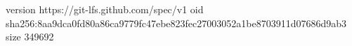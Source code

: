 version https://git-lfs.github.com/spec/v1
oid sha256:8aa9dca0fd80a86ca9779fc47ebe823fec27003052a1be8703911d07686d9ab3
size 349692
